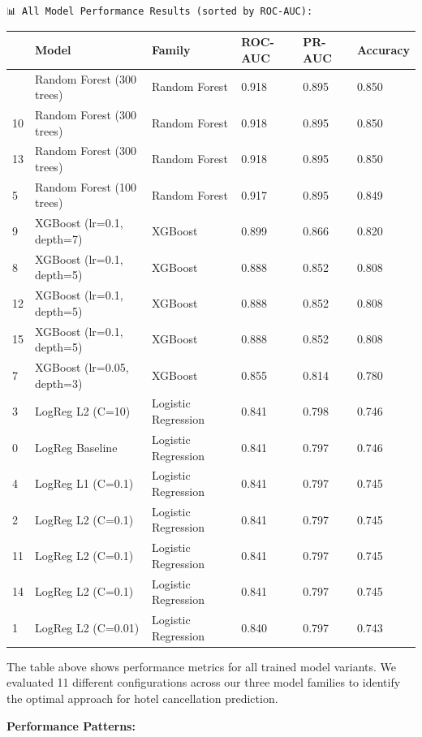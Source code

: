 \documentclass[
  letterpaper,
  DIV=11,
  numbers=noendperiod]{scrartcl}
\begin{document}
\begin{verbatim}
📊 All Model Performance Results (sorted by ROC-AUC):
\end{verbatim}

\begin{longtable}[]{@{}llllll@{}}
\toprule\noalign{}
& Model & Family & ROC-AUC & PR-AUC & Accuracy \\
\midrule\noalign{}
\endhead
\bottomrule\noalign{}
\endlastfoot
6 & Random Forest (300 trees) & Random Forest & 0.918 & 0.895 & 0.850 \\
10 & Random Forest (300 trees) & Random Forest & 0.918 & 0.895 &
0.850 \\
13 & Random Forest (300 trees) & Random Forest & 0.918 & 0.895 &
0.850 \\
5 & Random Forest (100 trees) & Random Forest & 0.917 & 0.895 & 0.849 \\
9 & XGBoost (lr=0.1, depth=7) & XGBoost & 0.899 & 0.866 & 0.820 \\
8 & XGBoost (lr=0.1, depth=5) & XGBoost & 0.888 & 0.852 & 0.808 \\
12 & XGBoost (lr=0.1, depth=5) & XGBoost & 0.888 & 0.852 & 0.808 \\
15 & XGBoost (lr=0.1, depth=5) & XGBoost & 0.888 & 0.852 & 0.808 \\
7 & XGBoost (lr=0.05, depth=3) & XGBoost & 0.855 & 0.814 & 0.780 \\
3 & LogReg L2 (C=10) & Logistic Regression & 0.841 & 0.798 & 0.746 \\
0 & LogReg Baseline & Logistic Regression & 0.841 & 0.797 & 0.746 \\
4 & LogReg L1 (C=0.1) & Logistic Regression & 0.841 & 0.797 & 0.745 \\
2 & LogReg L2 (C=0.1) & Logistic Regression & 0.841 & 0.797 & 0.745 \\
11 & LogReg L2 (C=0.1) & Logistic Regression & 0.841 & 0.797 & 0.745 \\
14 & LogReg L2 (C=0.1) & Logistic Regression & 0.841 & 0.797 & 0.745 \\
1 & LogReg L2 (C=0.01) & Logistic Regression & 0.840 & 0.797 & 0.743 \\
\end{longtable}

The table above shows performance metrics for all trained model
variants. We evaluated 11 different configurations across our three
model families to identify the optimal approach for hotel cancellation
prediction.

\textbf{Performance Patterns:}
\end{document}
